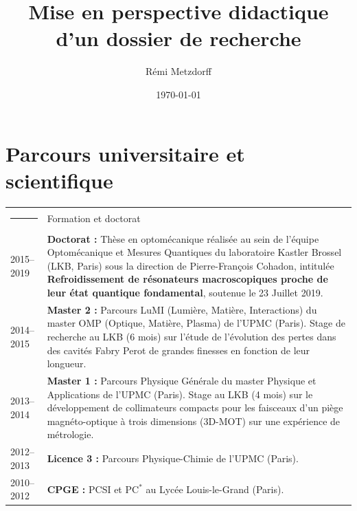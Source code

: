 \documentclass[12pt,a4paper]{article}
\title{Mise en perspective didactique d'un dossier de recherche}
\author{Rémi Metzdorff}
\date{\today}
\begin{document}
\maketitle


\section{Parcours universitaire et scientifique}

\noindent
\begin{tabular*}{\textwidth}{p{}<{\raggedleft}p{}}
\textcolor{theme}{\rule{0.12\textwidth}{2.5mm}} &
\large\textcolor{theme}{Formation et doctorat} \vspace{3pt} \\
2015--2019 &
\textbf{Doctorat :} Thèse en optomécanique réalisée au sein de l'équipe Optomécanique et Mesures Quantiques du laboratoire Kastler Brossel (LKB, Paris) sous la direction de Pierre-François Cohadon, intitulée \textbf{Refroidissement de résonateurs macroscopiques proche de leur état quantique fondamental}, soutenue le 23 Juillet 2019. \vspace{3pt} \\
2014--2015 &
\textbf{Master 2 :} Parcours LuMI (Lumière, Matière, Interactions) du master OMP (Optique, Matière, Plasma) de l'UPMC (Paris).
Stage de recherche au LKB (6 mois) sur l'étude de l'évolution des pertes dans des cavités Fabry Perot de grandes finesses en fonction de leur longueur. \vspace{3pt} \\
2013--2014 &
\textbf{Master 1 :} Parcours Physique Générale du master Physique et Applications de l'UPMC (Paris).
Stage au LKB (4 mois) sur le développement de collimateurs compacts pour les faisceaux d'un piège magnéto-optique à trois dimensions (3D-MOT) sur une expérience de métrologie. \vspace{3pt} \\
2012--2013 &
\textbf{Licence 3 :} Parcours Physique-Chimie de l'UPMC (Paris). \vspace{3pt} \\
2010--2012 &
\textbf{CPGE :} PCSI et PC$^*$ au Lycée Louis-le-Grand (Paris). \vspace{10pt} \\


\end{tabular*}
\end{document}

